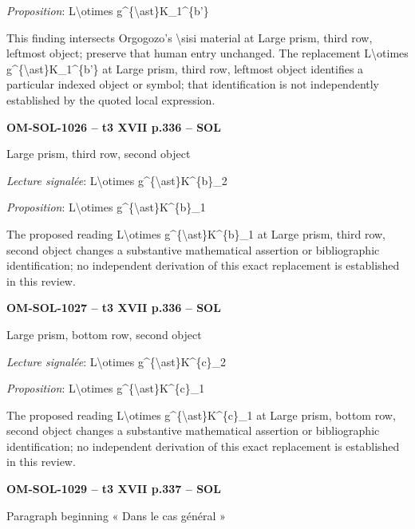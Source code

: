\emph{Proposition}: L\textbackslash{}otimes g\textasciicircum{}\{\textbackslash{}ast\}K\_1\textasciicircum{}\{b'\}\par
This finding intersects Orgogozo's \textbackslash{}sisi material at Large prism, third row, leftmost object; preserve that human entry unchanged. The replacement L\textbackslash{}otimes g\textasciicircum{}\{\textbackslash{}ast\}K\_1\textasciicircum{}\{b'\} at Large prism, third row, leftmost object identifies a particular indexed object or symbol; that identification is not independently established by the quoted local expression.\par
\par\noindent\textbf{OM-SOL-1026 -- t3 XVII p.336 -- SOL}\par
Large prism, third row, second object\par
\emph{Lecture signalée}: L\textbackslash{}otimes g\textasciicircum{}\{\textbackslash{}ast\}K\textasciicircum{}\{b\}\_2\par
\emph{Proposition}: L\textbackslash{}otimes g\textasciicircum{}\{\textbackslash{}ast\}K\textasciicircum{}\{b\}\_1\par
The proposed reading L\textbackslash{}otimes g\textasciicircum{}\{\textbackslash{}ast\}K\textasciicircum{}\{b\}\_1 at Large prism, third row, second object changes a substantive mathematical assertion or bibliographic identification; no independent derivation of this exact replacement is established in this review.\par
\par\noindent\textbf{OM-SOL-1027 -- t3 XVII p.336 -- SOL}\par
Large prism, bottom row, second object\par
\emph{Lecture signalée}: L\textbackslash{}otimes g\textasciicircum{}\{\textbackslash{}ast\}K\textasciicircum{}\{c\}\_2\par
\emph{Proposition}: L\textbackslash{}otimes g\textasciicircum{}\{\textbackslash{}ast\}K\textasciicircum{}\{c\}\_1\par
The proposed reading L\textbackslash{}otimes g\textasciicircum{}\{\textbackslash{}ast\}K\textasciicircum{}\{c\}\_1 at Large prism, bottom row, second object changes a substantive mathematical assertion or bibliographic identification; no independent derivation of this exact replacement is established in this review.\par
\par\noindent\textbf{OM-SOL-1029 -- t3 XVII p.337 -- SOL}\par
Paragraph beginning « Dans le cas général »\par
